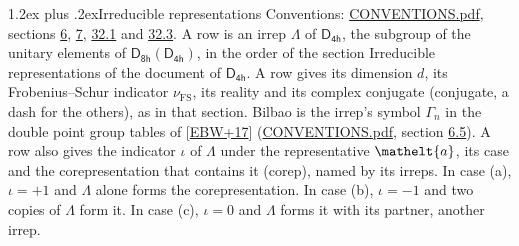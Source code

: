 \documentclass[10pt,a4paper]{article}
\makeatletter
\renewcommand\section{\@startsection{section}{1}{\z@}{-3ex plus -1ex minus -.2ex}%
  {1.2ex plus .2ex}{\normalfont\large\sffamily\bfseries\color{parttitle}}}
\numberwithin{equation}{section}
\newcommand{\eltfont}[1]{{\let\sigma\eltsigma\mathelt{#1}}}
\newcommand{\grp}[1]{\mathsf{#1}}
\newcommand{\elt}[1]{\eltfont{#1}}
\newcommand{\fsind}{\nu_{\mathrm{FS}}}
\makeatother
\begin{document}
\section{Irreducible representations}\label{s:irreps}
Conventions: \href{../../CONVENTIONS.pdf}{CONVENTIONS.pdf}, sections \href{../../../rotation/CONVENTIONS.pdf\#conv.6}{6}, \href{../../../rotation/CONVENTIONS.pdf\#conv.7}{7}, \href{../../CONVENTIONS.pdf\#conv.32.1}{32.1} and \href{../../CONVENTIONS.pdf\#conv.32.3}{32.3}.
\leavevmode\label{n:irrep.Delta}A row is an irrep $\Lambda$ of $\grp{D_{4h}}$, the subgroup of the unitary elements of $\grp{D_{8h}}(\grp{D_{4h}})$, in the order of the section Irreducible representations of the document of \href{../../../rotation/data/pdf/D4h.pdf}{$\grp{D_{4h}}$}. \label{n:index.dimension}\label{n:index.frobenius}\label{n:head.irrep}\label{n:head.reality}\label{n:head.conjugate}A row gives its dimension $d$, its Frobenius--Schur indicator $\fsind$, its reality and its complex conjugate (conjugate, a dash for the others), as in that section. \label{n:head.bilbao}\label{n:irrep.alias.gamma}Bilbao is the irrep's symbol $\Gamma_n$ in the double point group tables of [\href{../../../REFERENCES.pdf\#ref.EBW+17}{EBW+17}] (\href{../../CONVENTIONS.pdf}{CONVENTIONS.pdf}, section \href{../../../rotation/CONVENTIONS.pdf\#conv.6.5}{6.5}). \label{n:head.case.corep}\label{n:head.corep}A row also gives the indicator $\iota$ of $\Lambda$ under the representative $\elt{a}$, its case and the corepresentation that contains it (corep), named by its irreps. In case (a), $\iota = +1$ and $\Lambda$ alone forms the corepresentation. In case (b), $\iota = -1$ and two copies of $\Lambda$ form it. In case (c), $\iota = 0$ and $\Lambda$ forms it with its partner, another irrep.
\setlength{\emergencystretch}{2em}\par\setlength{\emergencystretch}{0pt}
\end{document}
